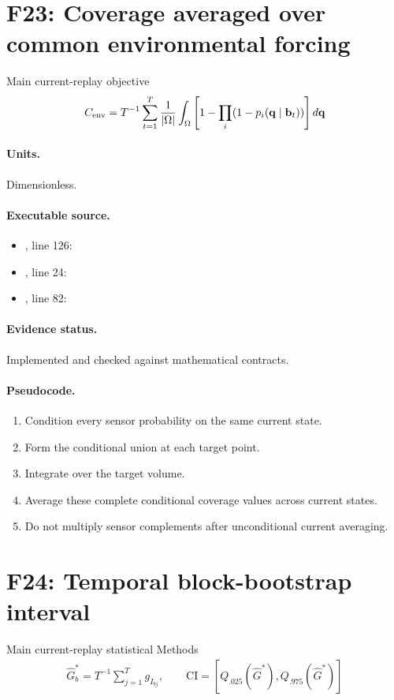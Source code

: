 \documentclass[10pt]{article}
\begin{document}
\section*{F23: Coverage averaged over common environmental forcing}
Main current-replay objective
\begin{gather*}C_{\rm env}=T^{-1}\sum_{t=1}^{T}\frac1{|\Omega|}\int_\Omega\left[1-\prod_i(1-p_i(\mathbf q\mid\mathbf b_t))\right]d\mathbf q\end{gather*}
\paragraph{Units.} Dimensionless.
\paragraph{Executable source.}
\begin{itemize}[leftmargin=*]
\item {}, line 126: 
\item {}, line 24: 
\item {}, line 82: 
\end{itemize}
\paragraph{Evidence status.} Implemented and checked against mathematical contracts.
\paragraph{Pseudocode.}
\begin{enumerate}[leftmargin=*]
\item Condition every sensor probability on the same current state.
\item Form the conditional union at each target point.
\item Integrate over the target volume.
\item Average these complete conditional coverage values across current states.
\item Do not multiply sensor complements after unconditional current averaging.
\end{enumerate}
\newpage
\section*{F24: Temporal block-bootstrap interval}
Main current-replay statistical Methods
\begin{gather*}\widehat G^*_b=T^{-1}\sum_{j=1}^{T}g_{I_{bj}},\qquad\mathrm{CI}=[Q_{.025}(\widehat G^*),Q_{.975}(\widehat G^*)]\end{gather*}
\end{document}

